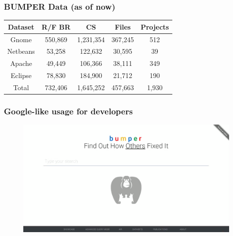 \documentclass{beamer}
\begin{document}
\begin{frame}

  \frametitle{BUMPER Data (as of now)}

  \begin{table}[]
  \centering
  \begin{tabular}{c|c|c|c|c}
  \textbf{Dataset} & \textbf{R/F BR} & \textbf{CS} & \textbf{Files} & \textbf{Projects} \\ \hline \hline
  Gnome            & 550,869         & 1,231,354   & 367,245        & 512                \\ \hline
  Netbeans         & 53,258          & 122,632     & 30,595         & 39                \\ \hline
  Apache           & 49,449          & 106,366     & 38,111         & 349               \\ \hline
  Eclipse          & 78,830          & 184,900     & 21,712         & 190                \\ \hline \hline
  Total            & 732,406         & 1,645,252   & 457,663        & 1,930               \\ \hline \hline
  \end{tabular}
  \vspace{-2em}
  \end{table}

\end{frame}

\begin{frame}

  \frametitle{Google-like usage for developers}

  \begin{figure}
    \centering
    \includegraphics[width=1\textwidth]{../media/interface.png}
  \vspace{-1.8em}
  \end{figure}

\end{frame}
\end{document}
